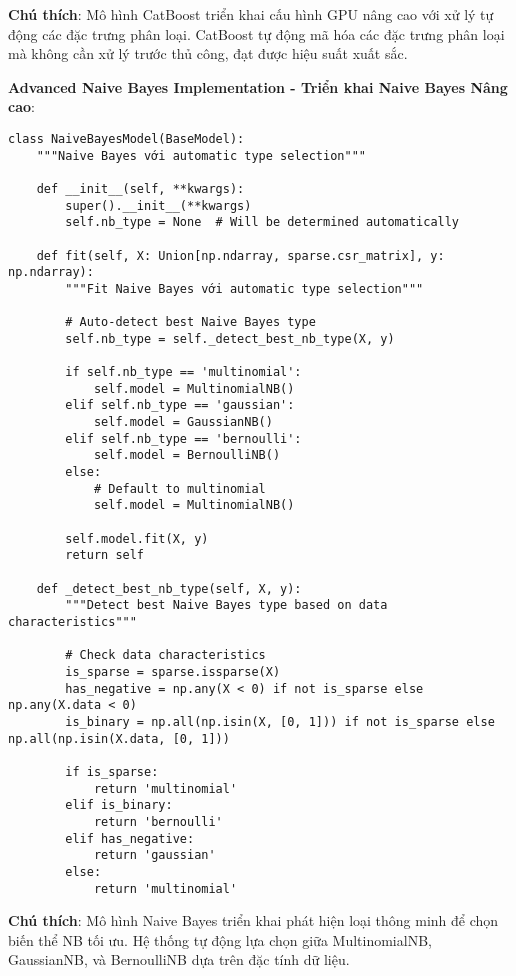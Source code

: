 \textbf{Chú thích}: Mô hình CatBoost triển khai cấu hình GPU nâng cao với xử lý tự động các đặc trưng phân loại. CatBoost tự động mã hóa các đặc trưng phân loại mà không cần xử lý trước thủ công, đạt được hiệu suất xuất sắc.

\textbf{Advanced Naive Bayes Implementation - Triển khai Naive Bayes Nâng cao}:

\begin{verbatim}
class NaiveBayesModel(BaseModel):
    """Naive Bayes với automatic type selection"""
    
    def __init__(self, **kwargs):
        super().__init__(**kwargs)
        self.nb_type = None  # Will be determined automatically
        
    def fit(self, X: Union[np.ndarray, sparse.csr_matrix], y: np.ndarray):
        """Fit Naive Bayes với automatic type selection"""
        
        # Auto-detect best Naive Bayes type
        self.nb_type = self._detect_best_nb_type(X, y)
        
        if self.nb_type == 'multinomial':
            self.model = MultinomialNB()
        elif self.nb_type == 'gaussian':
            self.model = GaussianNB()
        elif self.nb_type == 'bernoulli':
            self.model = BernoulliNB()
        else:
            # Default to multinomial
            self.model = MultinomialNB()
            
        self.model.fit(X, y)
        return self
        
    def _detect_best_nb_type(self, X, y):
        """Detect best Naive Bayes type based on data characteristics"""
        
        # Check data characteristics
        is_sparse = sparse.issparse(X)
        has_negative = np.any(X < 0) if not is_sparse else np.any(X.data < 0)
        is_binary = np.all(np.isin(X, [0, 1])) if not is_sparse else np.all(np.isin(X.data, [0, 1]))
        
        if is_sparse:
            return 'multinomial'
        elif is_binary:
            return 'bernoulli'
        elif has_negative:
            return 'gaussian'
        else:
            return 'multinomial'
\end{verbatim}

\textbf{Chú thích}: Mô hình Naive Bayes triển khai phát hiện loại thông minh để chọn biến thể NB tối ưu. Hệ thống tự động lựa chọn giữa MultinomialNB, GaussianNB, và BernoulliNB dựa trên đặc tính dữ liệu.

